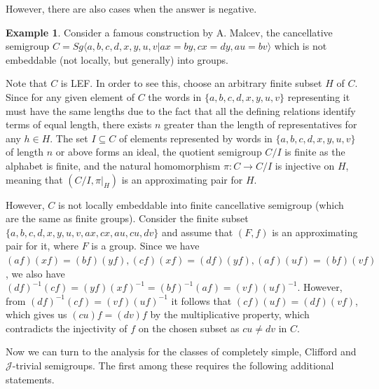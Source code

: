 \documentclass{article}
\theoremstyle{definition}
\newtheorem{example}{Example}
\def\J{\mathcal J}
\begin{document}
However, there are also cases when the answer is negative.

\begin{example}
Consider a famous construction by A. Malcev, the cancellative semigroup $C = Sg \langle a,b,c,d,x,y,u,v| ax = by, cx = dy, au =bv\rangle$ which is not embeddable (not locally, but generally) into groups.

Note that $C$ is LEF. In order to see this, choose an arbitrary finite subset $H$ of $C$. Since for any given element of $C$ the words in $\{a,b,c,d,x,y,u,v\}$ representing it must have the same lengths due to the fact that all the defining relations identify terms of equal length, there exists $n$ greater than the length of representatives for any $h \in H$. The set $I \subseteq C$ of elements represented by words in $\{a,b,c,d,x,y,u,v\}$ of length $n$ or above forms an ideal, the quotient semigroup $C /I$ is finite as the alphabet is finite, and the natural homomorphism $\pi: C \rightarrow C/I$ is injective on $H$, meaning that $(C/I, \pi|_H)$ is an approximating pair for $H$.

However, $C$ is not locally embeddable into finite cancellative semigroup (which are the same as finite groups). Consider the finite subset $\{a,b,c,d,x,y,u,v,ax,cx,au,cu,dv\}$ and assume that $(F, f)$ is an approximating pair for it, where $F$ is a group. Since we have $(af)(xf) = (bf)(yf), (cf)(xf) = (df)(yf), (af)(uf) =(bf)(vf)$, we also have $(df)^{-1} (cf) = (yf)(xf)^{-1} =  (bf)^{-1} (af) = (vf)(uf)^{-1} $. However, from  $(df)^{-1} (cf)  = (vf)(uf)^{-1} $ it follows that  $(cf) (uf)  = (df)(vf)$, which gives us $(cu) f = (dv) f$ by the multiplicative property, which contradicts the injectivity of $f$ on the chosen subset as $cu \neq dv$ in $C$.
\end{example}

Now we can turn to the analysis for the classes of completely simple, Clifford and $\J$-trivial semigroups. The first among these requires the following additional statements.
\end{document}

